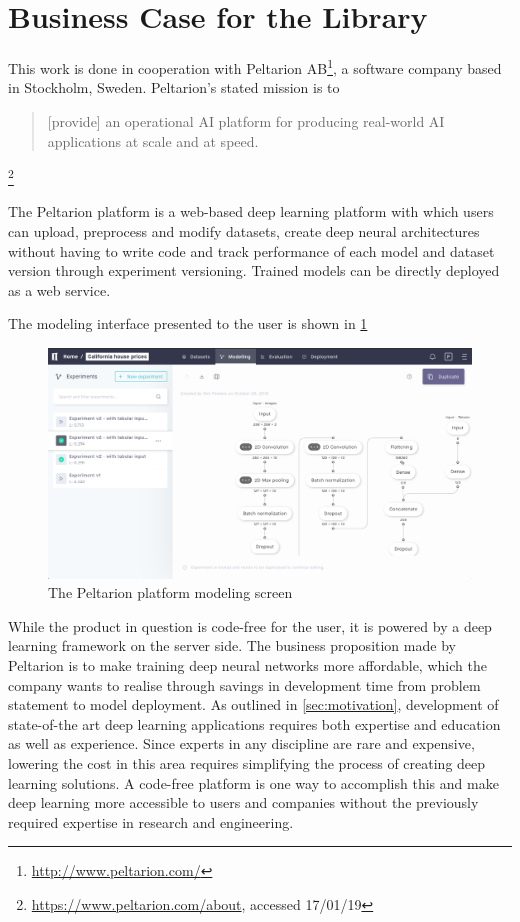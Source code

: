 \section{Business Case for the Library}\label{business-case}

This work is done in cooperation with Peltarion
AB\footnote{\url{http://www.peltarion.com/}}, a software company based in
Stockholm, Sweden. Peltarion's stated mission is to

\begin{quote}
    [provide] an
    operational AI platform for producing real-world AI applications at scale and at
    speed.
\end{quote}\footnote{\url{https://www.peltarion.com/about}, accessed 17/01/19}

The Peltarion platform is a web-based deep learning platform with which users
can upload, preprocess and modify datasets, create deep neural architectures
without having to write code and track performance of each model and dataset
version through experiment versioning. Trained models can be directly deployed
as a web service.

The modeling interface presented to the user is shown in \cref{fig:platform}

\begin{figure}
    \centering
    \includegraphics[width=\textwidth]{gfx/diagrams/software_screens/peltarion_platform.png}
    \caption{The Peltarion platform modeling screen}
    \label{fig:platform}
\end{figure}

While the product in question is code-free for the user, it is powered by a deep
learning framework on the server side. The business proposition made by
Peltarion is to make training deep neural networks more affordable, which the
company wants to realise through savings in development time from problem
statement to model deployment. As outlined in \cref{sec:motivation}, development
of state-of-the art deep learning applications requires both expertise and
education as well as experience. Since experts in any discipline are rare and
expensive, lowering the cost in this area requires simplifying the process of
creating deep learning solutions. A code-free platform is one way to accomplish
this and make deep learning more accessible to users and companies without the
previously required expertise in research and engineering.

